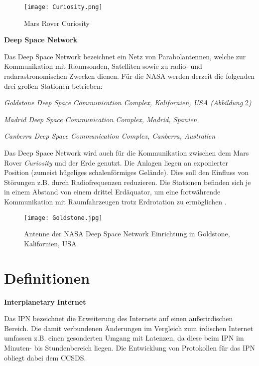 \begin{figure}[H]
\centering
\texttt{[image: Curiosity.png]}
\caption[Mars Rover Curiosity]{Mars Rover Curiosity \cite{imgCuriosity}}
\label{fig:Curiosity}
\end{figure}

\textbf{Deep Space Network} \newline

Das Deep Space Network bezeichnet ein Netz von Parabolantennen, welche zur
Kommunikation mit Raumsonden, Satelliten sowie zu radio-
und radarastronomischen Zwecken dienen. F{\"u}r die NASA werden derzeit die
folgenden drei gro{\ss}en Stationen betrieben:

\begin{compactenum}[a)]
\item \textit{Goldstone Deep Space Communication Complex, Kalifornien, USA
(Abbildung} \ref{fig:Goldstone}\textit{)}
\item \textit{Madrid Deep Space Communication Complex, Madrid, Spanien}
\item \textit{Canberra Deep Space Communication Complex, Canberra, Australien}
\end{compactenum}

Das Deep Space Network wird auch f{\"u}r die Kommunikation zwischen dem Mars
Rover \textit{Curiosity} und der Erde genutzt. Die Anlagen liegen an exponierter Position
(zumeist h{\"u}geliges schalenf{\"o}rmiges Gel{\"a}nde). Dies soll den
Einfluss von St{\"o}rungen z.B. durch Radiofrequenzen reduzieren. Die Stationen
befinden sich je in einem Abstand von einem drittel Erd{\"a}quator, um eine
fortw{\"a}hrende Kommunikation mit Raumfahrzeugen trotz Erdrotation zu
erm{\"o}glichen \cite{web6}.

\begin{figure}[H]
\centering
\texttt{[image: Goldstone.jpg]}
\caption[Antenne der NASA Deep Space Network Einrichtung in Goldstone, Kalifornien, USA]
{Antenne der NASA Deep Space Network Einrichtung in Goldstone, Kalifornien, USA \cite{imgGoldstone}}
\label{fig:Goldstone}
\end{figure}

\section{Definitionen}

\textbf{Interplanetary Internet}

Das \gls{IPN} bezeichnet die Erweiterung des Internets
auf einen au{\ss}erirdischen Bereich. Die damit verbundenen {\"A}nderungen im
Vergleich zum irdischen Internet umfassen z.B. einen gesonderten Umgang mit
Latenzen, da diese beim \gls{IPN} im Minuten- bis Stundenbereich liegen. Die
Entwicklung von Protokollen f{\"u}r das \gls{IPN} obliegt dabei dem \gls{CCSDS}.

